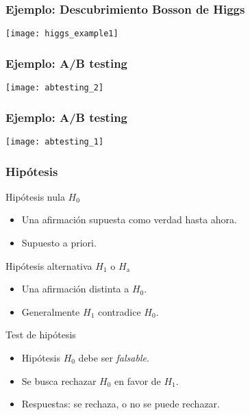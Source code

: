 \documentclass[table]{beamer}
\begin{document}
\begin{frame}
    \frametitle{Ejemplo: Descubrimiento Bosson de Higgs}
    \begin{center}
        \texttt{[image: higgs\_example1]}
    \end{center}
\end{frame}

\begin{frame}
    \frametitle{Ejemplo: A/B testing}
    \begin{center}
        \texttt{[image: abtesting\_2]}
    \end{center}
\end{frame}

\begin{frame}
    \frametitle{Ejemplo: A/B testing}
    \begin{center}
        \texttt{[image: abtesting\_1]}
    \end{center}
\end{frame}

\begin{frame}
    \frametitle{Hipótesis}
    \begin{block}{Hipótesis nula $H_{0}$}
        \begin{itemize}
            \item Una afirmación supuesta como verdad hasta ahora.
            \item Supuesto a priori.
        \end{itemize}
    \end{block}
    \begin{block}{Hipótesis alternativa $H_{1}$ o $H_{\text{a}}$}
        \begin{itemize}
            \item Una afirmación distinta a $H_{0}$.
            \item Generalmente $H_{1}$ contradice $H_{0}$.
        \end{itemize}
    \end{block}
    \begin{block}{Test de hipótesis}
        \begin{itemize}
            \item Hipótesis $H_{0}$ debe ser \emph{falsable}.
            \item Se busca rechazar $H_{0}$ en favor de $H_{1}$.
            \item Respuestas: se rechaza, o no se puede rechazar.
        \end{itemize}
    \end{block}
\end{frame}
\end{document}
